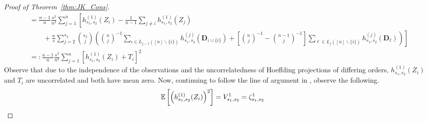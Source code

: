 \begin{proof}[Proof of Theorem~\ref{thm:JK_Cons}]
\begin{equation}
\begin{aligned}
			 & = \frac{n-1}{n} \frac{s^2}{n^2}\sum_{j = 1}^{n}\left[
				h^{(1)}_{s_1, s_2}(Z_{i})
			- \frac{1}{n-1} \sum_{j \neq i} h^{(1)}_{s_1, s_2}(Z_{j}) \right.                                   \\
			 & \quad \quad + \left. \frac{n}{s}\sum_{j = 2}^{s_2}\binom{s_2}{j}\left(
				\binom{n}{j}^{-1}\sum_{\iota \in L_{j-1}\left([n] \backslash \{i\}\right)} h^{(j)}_{s_1, s_2}(\mathbf{D}_{\iota \cup \{i\}})
				+ \left[\binom{n}{j}^{-1} - \binom{n - 1}{j}^{-1}\right] \sum_{\ell \in L_{j}\left([n] \backslash \{i\}\right)} h^{(j)}_{s_1, s_2}(\mathbf{D}_{\ell})
				\right)
			\right]                                                                                             \\
			 & =: \frac{n-1}{n}\frac{s^2}{n^2} \sum_{j = 1}^{n}\left[h^{(1)}_{s_1, s_2}(Z_{i}) + T_{i}\right]^2
		\end{aligned}
	\end{equation}
	Observe that due to the independence of the observations and the uncorrelatedness of Hoeffding projections of differing orders, $h^{(1)}_{s_1, s_2}(Z_{i})$ and $T_{i}$ are uncorrelated and both have mean zero.
	Now, continuing to follow the line of argument in \citet{peng_bias_2021}, observe the following.
	\begin{equation}
		\begin{aligned}
			\mathbb{E}\left[\left(h^{(1)}_{s_1, s_2}(Z_{i})\right)^{2}\right]
			 & = V_{s_1, s_2}^{1}
			= \zeta_{s_1, s_2}^{1}
		\end{aligned}
	\end{equation}


\end{proof}
